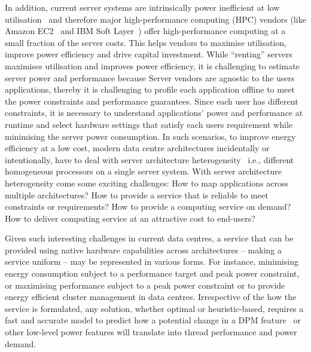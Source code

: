  In addition, current server systems are intrinsically power inefficient at
low utilisation~\citep{Petrucci2015Octopus-Man:Computers, Meisner2011PowerServices,
Lo2015Heracles, Lo2014TowardsWorkloads, Hoelzle2009TheMachinesb} and therefore major
high-performance computing (HPC) vendors (like Amazon EC2~\citep{ec2pricing} and IBM Soft
Layer~\citep{IBMTivoli}) offer high-performance computing at a small fraction of the
server costs. This helps vendors to maximise utilisation, improve power efficiency and
drive capital investment. While ``renting'' servers maximises utilisation and improves
power efficiency, it is challenging to estimate server power and performance because
{\small {}} Server vendors are agnostic to the users applications, thereby it is
challenging to profile each application offline to meet the power constraints and
performance guarantees.  {\small{}} Since each user has different constraints, it
is necessary to understand applications' power and performance at runtime and select
hardware settings that satisfy each users requirement while minimising the server power
consumption.  In such scenarios, to improve energy efficiency at a low cost, modern data
centre architectures incidentally or intentionally, have to deal with server architecture
heterogeneity~\citep{Mars2013Whare-map, Mars2011HeterogeneityOpportunity,
Nathuji:2007:EPH:1270385.1270764} i.e., different homogeneous processors on a single
server system.  With server architecture heterogeneity come some exciting challenges:
{\small {}} How to map applications across multiple architectures?  {\small
{}} How to provide a service that is reliable to meet constraints or
requirements?  {\small {}} How to provide a computing service on demand?  {\small
{}} How to deliver computing service at an attractive cost to end-users?


Given such interesting challenges in current data centres, a service that can be provided
using native hardware capabilities across architectures -- making a service uniform -- may
be represented in various forms. For instance, minimising energy consumption subject to a
performance target and peak power constraint, or maximising performance subject to a peak
power constraint or to provide energy efficient cluster management in data centres.
Irrespective of the how the service is formulated, any solution, whether optimal or
heuristic-based, requires a fast and accurate model to predict how a potential change in a
DPM feature~\citep{acpikernel} or other low-level power features will translate into thread
performance and power demand. 

